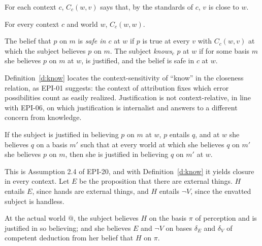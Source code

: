 \documentclass{situationist-preprint}
\begin{document}
\begin{definition}\label{d:close}
For each context $c$, $C_c(w,v)$ says that, by the standards of $c$, $v$ is close to $w$.
\end{definition}

\begin{assumption}[Centring]\label{a:centring}
For every context $c$ and world $w$, $C_c(w,w)$.
\end{assumption}

\begin{definition}\label{d:know}
The belief that $p$ on $m$ is \emph{safe in $c$} at $w$ if $p$ is true at every $v$ with $C_c(w,v)$ at which the subject believes $p$ on $m$. The subject \emph{knows$_c$} $p$ at $w$ if for some basis $m$ she believes $p$ on $m$ at $w$, is justified, and the belief is safe in $c$ at $w$.
\end{definition}

Definition~\ref{d:know} locates the context-sensitivity of \enquote{know} in the closeness relation, as EPI-01 suggests: the context of attribution fixes which error possibilities count as easily realized. Justification is not context-relative, in line with EPI-06, on which justification is internalist and answers to a different concern from knowledge.

\begin{assumption}\label{a:jclosure}
If the subject is justified in believing $p$ on $m$ at $w$, $p$ entails $q$, and at $w$ she believes $q$ on a basis $m'$ such that at every world at which she believes $q$ on $m'$ she believes $p$ on $m$, then she is justified in believing $q$ on $m'$ at $w$.
\end{assumption}

This is Assumption 2.4 of EPI-20, and with Definition~\ref{d:know} it yields closure in every context. Let $E$ be the proposition that there are external things. $H$ entails $E$, since hands are external things, and $H$ entails $\neg V$, since the envatted subject is handless.

\begin{assumption}\label{a:moore}
At the actual world $@$, the subject believes $H$ on the basis $\pi$ of perception and is justified in so believing; and she believes $E$ and $\neg V$ on bases $\delta_E$ and $\delta_V$ of competent deduction from her belief that $H$ on $\pi$.
\end{assumption}
\end{document}
